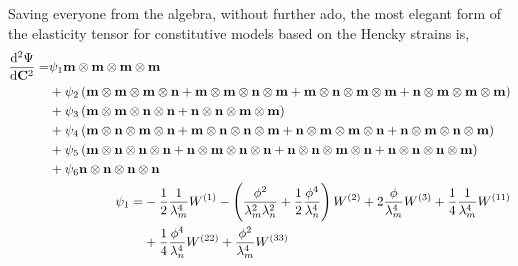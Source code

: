 	Saving everyone from the algebra, without further ado, the most elegant form of the elasticity tensor for constitutive models based on the Hencky strains is, 
\begin{subequations} \label{eqn:elasticityhencky}
\begin{align}
\begin{split}
\dod[2]{\Psi}{\mathbf{C}} =&
	\psi_1 \mathbf{m}\otimes\mathbf{m}\otimes\mathbf{m}\otimes\mathbf{m}	\\
    &+ \psi_2
    	\left(
        	\mathbf{m}\otimes\mathbf{m}\otimes\mathbf{m}\otimes\mathbf{n}
            +\mathbf{m}\otimes\mathbf{m}\otimes\mathbf{n}\otimes\mathbf{m}
            +\mathbf{m}\otimes\mathbf{n}\otimes\mathbf{m}\otimes\mathbf{m}
            +\mathbf{n}\otimes\mathbf{m}\otimes\mathbf{m}\otimes\mathbf{m}
        \right)	\\
    &+ \psi_3
    	\left(
        	\mathbf{m}\otimes\mathbf{m}\otimes\mathbf{n}\otimes\mathbf{n}
            +\mathbf{n}\otimes\mathbf{n}\otimes\mathbf{m}\otimes\mathbf{m}
        \right)	\\
    &+ \psi_4
    	\left(
        	\mathbf{m}\otimes\mathbf{n}\otimes\mathbf{m}\otimes\mathbf{n}
            +\mathbf{m}\otimes\mathbf{n}\otimes\mathbf{n}\otimes\mathbf{m}
            +\mathbf{n}\otimes\mathbf{m}\otimes\mathbf{m}\otimes\mathbf{n}
            +\mathbf{n}\otimes\mathbf{m}\otimes\mathbf{n}\otimes\mathbf{m}
        \right)	\\
    &+ \psi_5
    	\left(
        	\mathbf{m}\otimes\mathbf{n}\otimes\mathbf{n}\otimes\mathbf{n}
            +\mathbf{n}\otimes\mathbf{m}\otimes\mathbf{n}\otimes\mathbf{n}
            +\mathbf{n}\otimes\mathbf{n}\otimes\mathbf{m}\otimes\mathbf{n}
            +\mathbf{n}\otimes\mathbf{n}\otimes\mathbf{n}\otimes\mathbf{m}
        \right)	\\
    &+ \psi_6 \mathbf{n}\otimes\mathbf{n}\otimes\mathbf{n}\otimes\mathbf{n}
\end{split}	\\
\begin{split}
\psi_1 =&
        -\frac{1}{2}\frac{1}{\lambda_m^4}W^{(1)}
        -\left(\frac{\phi^2}{\lambda_m^2\lambda_n^2}+\frac{1}{2}\frac{\phi^4}{\lambda_n^4}\right)W^{(2)}
        +2\frac{\phi}{\lambda_m^4}W^{(3)}
        +\frac{1}{4}\frac{1}{\lambda_m^4}W^{(11)}   \\
        &+\frac{1}{4}\frac{\phi^4}{\lambda_n^4}W^{(22)}
        +\frac{\phi^2}{\lambda_m^4}W^{(33)}

\end{split}
\end{align}
\end{subequations}
